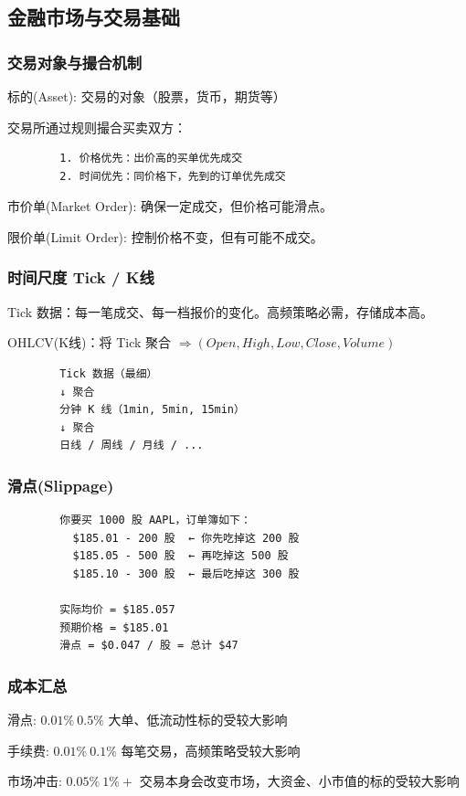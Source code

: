 \subsection{金融市场与交易基础}

\begin{frame}[fragile]
    \frametitle{交易对象与撮合机制}

    \alert{标的(Asset)}: 交易的对象（股票，货币，期货等）

    交易所通过规则撮合买卖双方：

    \begin{verbatim}
        1. 价格优先：出价高的买单优先成交
        2. 时间优先：同价格下，先到的订单优先成交
    \end{verbatim}

    \alert{市价单(Market Order)}: 确保一定成交，但价格可能滑点。
    
    \alert{限价单(Limit Order)}: 控制价格不变，但有可能不成交。
\end{frame}

\begin{frame}[fragile]
    \frametitle{时间尺度 Tick / K线}
    
    \alert{Tick 数据}：每一笔成交、每一档报价的变化。高频策略必需，存储成本高。

    \alert{OHLCV(K线)}：将 Tick 聚合 $\Rightarrow (Open, High, Low, Close, Volume)$

    \begin{verbatim}
        Tick 数据（最细）
        ↓ 聚合
        分钟 K 线（1min, 5min, 15min）
        ↓ 聚合
        日线 / 周线 / 月线 / ...
    \end{verbatim}
\end{frame}

\begin{frame}[fragile]
    \frametitle{滑点(Slippage)}

    \begin{verbatim}
        你要买 1000 股 AAPL，订单簿如下：
          $185.01 - 200 股  ← 你先吃掉这 200 股
          $185.05 - 500 股  ← 再吃掉这 500 股
          $185.10 - 300 股  ← 最后吃掉这 300 股
        
        实际均价 = $185.057
        预期价格 = $185.01
        滑点 = $0.047 / 股 = 总计 $47
    \end{verbatim}
\end{frame}

\begin{frame}
    \frametitle{成本汇总}

    \alert{滑点}: $0.01\% ~ 0.5\%$ 大单、低流动性标的受较大影响
    
    \alert{手续费}: $0.01\% ~ 0.1\%$ 每笔交易，高频策略受较大影响

    \alert{市场冲击}: $0.05\% ~ 1\%+$ 交易本身会改变市场，大资金、小市值的标的受较大影响
\end{frame}

